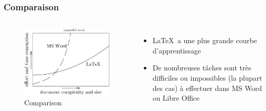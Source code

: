 \documentclass[10pt]{beamer}\usepackage[]{graphicx}\usepackage[]{color}
\begin{document}
\begin{frame}\frametitle{Comparaison}
\begin{columns}[c] %

\begin{figure}[h!]
\centering
\includegraphics[scale=1, keepaspectratio]{./miktex}
\caption{Comparison}
\label{fig:word}
\end{figure}

\begin{itemize}
\item \LaTeX \, a une plus grande courbe d'apprentissage
\item De nombreuses tâches sont très difficiles ou impossibles (la plupart des cas) à effectuer dans MS Word ou Libre Office
\end{itemize}
\end{columns}

\end{frame}

\end{document}
